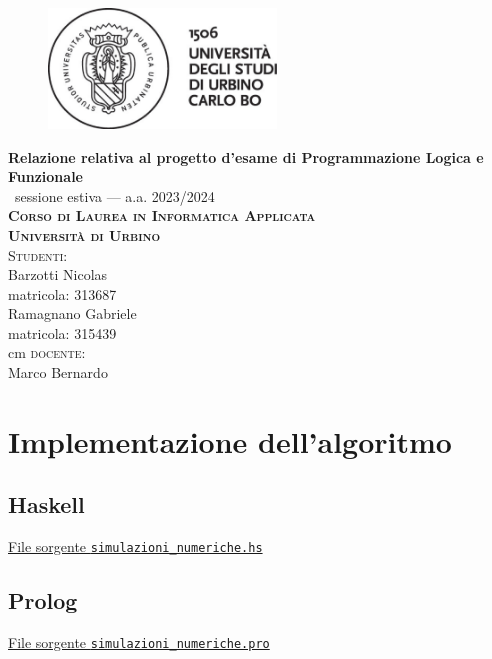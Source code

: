 \documentclass{article}
\begin{document}

\begin{titlepage}
	\centering
	\begin{figure}
	\vspace{2.5cm}
    \centerline{\includegraphics[height=3.2cm]{Resources/logo-uniurb-2016.jpg.eps}}
    \end{figure}
	\vspace*{\baselineskip}
	\LARGE{\bfseries Relazione relativa al progetto d'esame di Programmazione Logica e Funzionale }\\
	\Large{\ sessione estiva --- a.a. 2023/2024}\\ [0.6cm]
	\large{\textbf{\scshape{Corso di Laurea in Informatica Applicata\\ Università di Urbino}}}\\[3cm]
		{\large {\scshape Studenti:}\\[0.3cm] Barzotti Nicolas\\matricola: 313687\\
        Ramagnano Gabriele\\matricola: 315439}\\
         cm
	     \large{{\scshape docente:} \\[0.3cm] Marco Bernardo}\\[1.3cm]
	
\end{titlepage}

\index 
\tableofcontents

   
 

\section{Implementazione dell'algoritmo}

\subsection{Haskell}
\underline{File sorgente \texttt{simulazioni\_numeriche.hs}} 


\newpage
\subsection{Prolog}
\underline{File sorgente \texttt{simulazioni\_numeriche.pro}}


%

\end{document}
